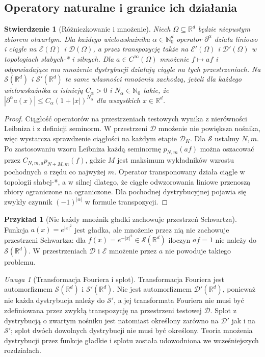 \documentclass[11pt,a4paper]{article}
\numberwithin{equation}{section}
\theoremstyle{plain}
\newtheorem{stwierdzenie}[twierdzenie]{Stwierdzenie}
\theoremstyle{definition}
\newtheorem{przyklad}[twierdzenie]{Przykład}
\theoremstyle{remark}
\newtheorem{uwaga}[twierdzenie]{Uwaga}
\newcommand{\R}{\mathbb R}
\newcommand{\N}{\mathbb N}
\begin{document}
\subsection{Operatory naturalne i granice ich działania}

\begin{stwierdzenie}[Różniczkowanie i mnożenie]
\label{prop:ops25}
Niech $\Omega\subseteq\R^d$ będzie niepustym zbiorem otwartym.
Dla każdego wielowskaźnika $\alpha\in\N_0^d$
operator $\partial^\alpha$ działa liniowo i ciągle na
$\mathcal E(\Omega)$ i $\mathcal D(\Omega)$, a przez
transpozycję także na $\mathcal E'(\Omega)$ i
$\mathcal D'(\Omega)$ w topologiach słabych-* i silnych.
Dla $a\in C^\infty(\Omega)$ mnożenie $f\mapsto af$
i odpowiadające mu mnożenie dystrybucji działają ciągle
na tych przestrzeniach.
Na $\mathcal S(\R^d)$ i $\mathcal S'(\R^d)$ te same
własności mnożenia zachodzą, jeżeli dla każdego
wielowskaźnika $\alpha$ istnieją $C_\alpha>0$ i
$N_\alpha\in\N_0$ takie, że
$|\partial^\alpha a(x)|\le C_\alpha(1+|x|)^{N_\alpha}$
dla wszystkich $x\in\R^d$.
\end{stwierdzenie}
\begin{proof}
Ciągłość operatorów na przestrzeniach testowych wynika z
nierówności Leibniza i z definicji seminorm. W przestrzeni
$\mathcal D$ mnożenie nie powiększa nośnika, więc
wystarcza sprawdzenie ciągłości na każdym etapie
$\mathcal D_K$. Dla $\mathcal S$ ustalmy $N,m$.
Po zastosowaniu wzoru Leibniza każdą seminormę
$p_{N,m}(af)$ można oszacować przez
$C_{N,m,a}p_{N+M,m}(f)$, gdzie $M$ jest maksimum
wykładników wzrostu pochodnych $a$ rzędu co najwyżej $m$.
Operator transponowany działa ciągle w topologii słabej-*,
a w silnej dlatego, że ciągłe odwzorowania liniowe
przenoszą zbiory ograniczone na ograniczone. Dla
pochodnej dystrybucyjnej pojawia się zwykły czynnik
$(-1)^{|\alpha|}$ w formule transpozycji.
\end{proof}

\begin{przyklad}[Nie każdy mnożnik gładki zachowuje przestrzeń Schwartza]
\label{ex:not-multiplier25}
Funkcja $a(x)=e^{|x|^2}$ jest gładka, ale mnożenie przez nią
nie zachowuje przestrzeni Schwartza: dla
$f(x)=e^{-|x|^2}\in\mathcal S(\R^d)$ iloczyn $af=1$
nie należy do $\mathcal S(\R^d)$. W przestrzeniach
$\mathcal D$ i $\mathcal E$ mnożenie przez $a$ nie
powoduje takiego problemu.
\end{przyklad}

\begin{uwaga}[Transformacja Fouriera i splot]
\label{rem:fourier-conv25}
Transformacja Fouriera jest automorfizmem
$\mathcal S(\R^d)$ i $\mathcal S'(\R^d)$.
Nie jest automorfizmem $\mathcal D'(\R^d)$, ponieważ
nie każda dystrybucja należy do $\mathcal S'$, a jej
transformata Fouriera nie musi być zdefiniowana przez
zwykłą transpozycję na przestrzeni testowej $\mathcal D$.
Splot z dystrybucją o zwartym nośniku jest natomiast
określony zarówno na $\mathcal D'$ jak i na $\mathcal S'$;
splot dwóch dowolnych dystrybucji nie musi być określony.
Teoria mnożenia dystrybucji przez funkcje gładkie i splotu
została udowodniona we wcześniejszych rozdziałach.
\end{uwaga}
\end{document}
